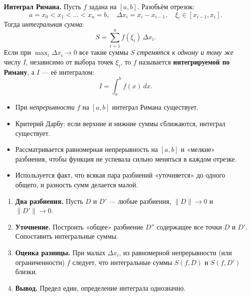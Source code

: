 

\textbf{Интеграл Римана.}
Пусть $f$ задана на $[a,b]$. Разобьём отрезок:
\[
a=x_0<x_1<\dots<x_n=b,
\quad
\Delta x_i=x_i - x_{i-1},
\quad
\xi_i\in[x_{i-1},x_i].
\]
Тогда \emph{интегральная сумма}:
\[
S=\sum_{i=1}^n f(\xi_i)\,\Delta x_i.
\]
Если при \(\max_i \Delta x_i\to0\) все такие суммы $S$ \emph{стремятся к одному и тому же} числу $I$, независимо от выбора точек $\xi_i$, то $f$ называется \textbf{интегрируемой по Риману}, а $I$ — её интегралом:
\[
I=\int_{a}^{b}f(x)\,dx.
\]

\medskip


\begin{itemize}
  \item При \emph{непрерывности} $f$ на $[a,b]$ интеграл Римана существует.
  \item Критерий Дарбу: если верхние и нижние суммы сближаются, интеграл существует.
\end{itemize}

\medskip


\begin{itemize}
  \item Рассматривается равномерная непрерывность на $[a,b]$ и «мелкие» разбиения, чтобы функция не успевала сильно меняться в каждом отрезке.
  \item Используется факт, что всякая пара разбиений «уточняется» до одного общего, и разность сумм делается малой.
\end{itemize}

\medskip


\begin{enumerate}
  \item \textbf{Два разбиения.}
    Пусть $D$ и $D'$ — любые разбиения, $\|D\|\to0$ и $\|D'\|\to0$.
  \item \textbf{Уточнение.}
    Построить «общее» разбиение $D''$ содержащее все точки $D$ и $D'$. Сопоставить интегральные суммы. 
  \item \textbf{Оценка разницы.}
    При малых $\Delta x_i$, из равномерной непрерывности (или ограниченности) $f$ следует, что интегральные суммы $S(f,D)$ и $S(f,D')$ близки. 
  \item \textbf{Вывод.}
    Предел един, определение интеграла однозначно.
\end{enumerate}

